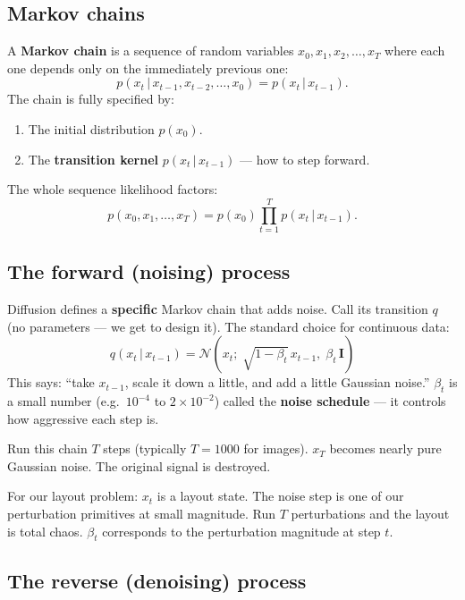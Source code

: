 \documentclass[11pt,a4paper]{article}
\newcommand{\N}{\mathcal{N}}
\newcommand{\given}{\,|\,}
\begin{document}
\subsection{Markov chains}

A \textbf{Markov chain} is a sequence of random variables
$x_0, x_1, x_2, \ldots, x_T$ where each one depends only on the
immediately previous one:
\[
p(x_t \given x_{t-1}, x_{t-2}, \ldots, x_0) = p(x_t \given x_{t-1}).
\]
The chain is fully specified by:
\begin{enumerate}[leftmargin=*]
\item The initial distribution $p(x_0)$.
\item The \textbf{transition kernel} $p(x_t \given x_{t-1})$ ---
  how to step forward.
\end{enumerate}
The whole sequence likelihood factors:
\[
p(x_0, x_1, \ldots, x_T)
   = p(x_0) \prod_{t=1}^{T} p(x_t \given x_{t-1}).
\]

\subsection{The forward (noising) process}

Diffusion defines a \textbf{specific} Markov chain that adds noise.
Call its transition $q$ (no parameters --- we get to design it). The
standard choice for continuous data:
\begin{equation}
\boxed{\;
q(x_t \given x_{t-1}) = \N\!\left(x_t;\;\sqrt{1-\beta_t}\, x_{t-1},\; \beta_t\, \mathbf{I}\right)\;}
\label{eq:fwd-step}
\end{equation}
This says: ``take $x_{t-1}$, scale it down a little, and add a little
Gaussian noise.'' $\beta_t$ is a small number (e.g.\ $10^{-4}$ to
$2\!\times\!10^{-2}$) called the \textbf{noise schedule} --- it controls
how aggressive each step is.

Run this chain $T$ steps (typically $T=1000$ for images). $x_T$
becomes nearly pure Gaussian noise. The original signal is destroyed.

For our layout problem: $x_t$ is a layout state. The noise step is
one of our perturbation primitives at small magnitude. Run $T$
perturbations and the layout is total chaos. $\beta_t$ corresponds
to the perturbation magnitude at step $t$.

\subsection{The reverse (denoising) process}
\end{document}
